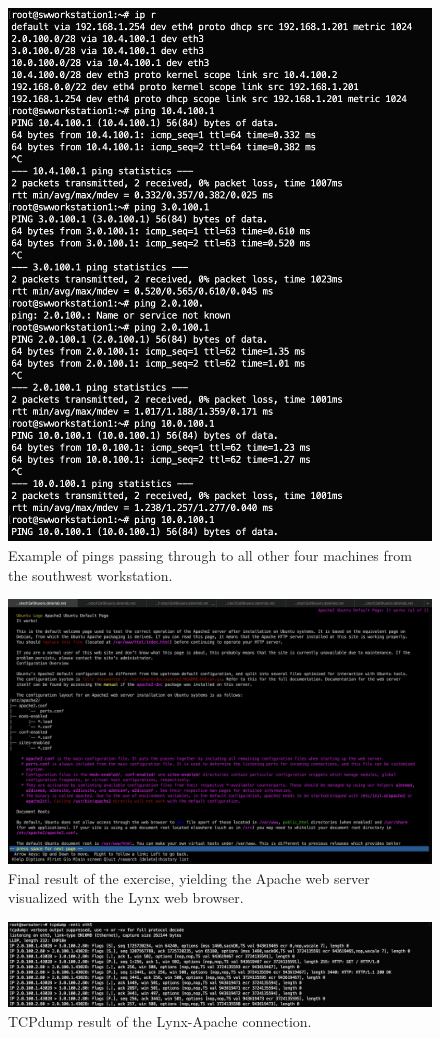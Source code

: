 \documentclass[a4paper,11pt,hidelinks]{article}
\begin{document}
\begin{figure}
  \centering
  \includegraphics[width=\textwidth]{../drawable/ping-result.png}
  \caption{Example of pings passing through to all other four machines from the southwest workstation.}
\end{figure}

\begin{figure}
  \centering
  \includegraphics[width=\textwidth]{../drawable/lynx-result.png}
  \caption{Final result of the exercise, yielding the Apache web server visualized with the Lynx web browser.}
\end{figure}

\begin{figure}
  \centering
  \includegraphics[width=\textwidth]{../drawable/tcpdump-nat-result.png}
  \caption{TCPdump result of the Lynx-Apache connection.}
\end{figure}

\endgroup
\end{document}
